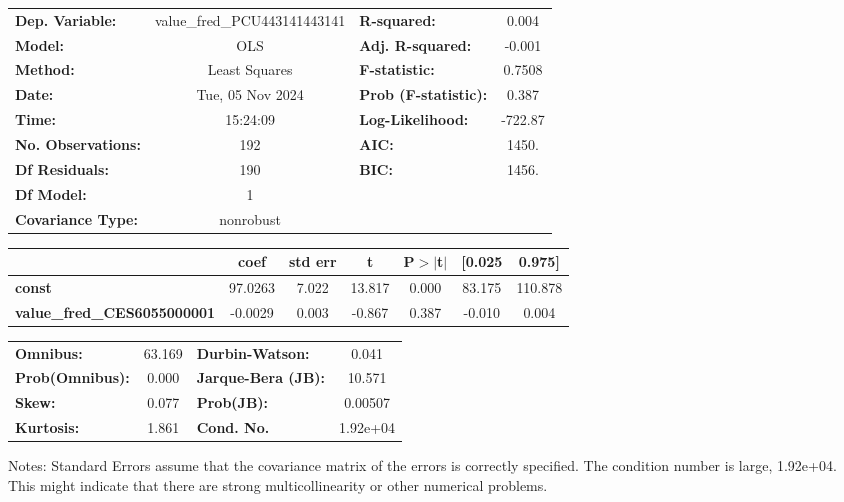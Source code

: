 \begin{center}
\begin{tabular}{lclc}
\toprule
\textbf{Dep. Variable:}             & value\_fred\_PCU443141443141 & \textbf{  R-squared:         } &     0.004   \\
\textbf{Model:}                     &             OLS              & \textbf{  Adj. R-squared:    } &    -0.001   \\
\textbf{Method:}                    &        Least Squares         & \textbf{  F-statistic:       } &    0.7508   \\
\textbf{Date:}                      &       Tue, 05 Nov 2024       & \textbf{  Prob (F-statistic):} &    0.387    \\
\textbf{Time:}                      &           15:24:09           & \textbf{  Log-Likelihood:    } &   -722.87   \\
\textbf{No. Observations:}          &               192            & \textbf{  AIC:               } &     1450.   \\
\textbf{Df Residuals:}              &               190            & \textbf{  BIC:               } &     1456.   \\
\textbf{Df Model:}                  &                 1            & \textbf{                     } &             \\
\textbf{Covariance Type:}           &          nonrobust           & \textbf{                     } &             \\
\bottomrule
\end{tabular}
\begin{tabular}{lcccccc}
                                    & \textbf{coef} & \textbf{std err} & \textbf{t} & \textbf{P$> |$t$|$} & \textbf{[0.025} & \textbf{0.975]}  \\
\midrule
\textbf{const}                      &      97.0263  &        7.022     &    13.817  &         0.000        &       83.175    &      110.878     \\
\textbf{value\_fred\_CES6055000001} &      -0.0029  &        0.003     &    -0.867  &         0.387        &       -0.010    &        0.004     \\
\bottomrule
\end{tabular}
\begin{tabular}{lclc}
\textbf{Omnibus:}       & 63.169 & \textbf{  Durbin-Watson:     } &    0.041  \\
\textbf{Prob(Omnibus):} &  0.000 & \textbf{  Jarque-Bera (JB):  } &   10.571  \\
\textbf{Skew:}          &  0.077 & \textbf{  Prob(JB):          } &  0.00507  \\
\textbf{Kurtosis:}      &  1.861 & \textbf{  Cond. No.          } & 1.92e+04  \\
\bottomrule
\end{tabular}
\end{center}

Notes: \newline
 [1] Standard Errors assume that the covariance matrix of the errors is correctly specified. \newline
 [2] The condition number is large, 1.92e+04. This might indicate that there are \newline
 strong multicollinearity or other numerical problems.